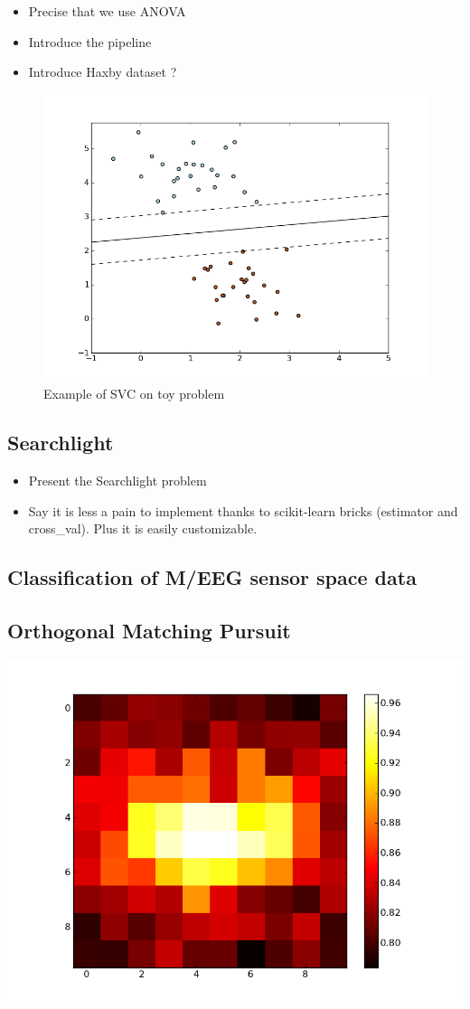 \documentclass{frontiersSCNS} %
\begin{document}
\begin{itemize}
    \item Precise that we use ANOVA
    \item Introduce the pipeline
    \item Introduce Haxby dataset ?
\end{itemize}




\begin{figure}
    \includegraphics[width=.5\linewidth]{img/plot_sgd_separating_hyperplane_1.png}
    \caption{Example of SVC on toy problem}
\end{figure}

\subsection{Searchlight}

\begin{itemize}
    \item Present the Searchlight problem
    \item Say it is less a pain to implement thanks to scikit-learn bricks
        (estimator and cross\_val). Plus it is easily customizable.
\end{itemize}

\subsection{Classification of M/EEG sensor space data}


\subsection{Orthogonal Matching Pursuit}




\includegraphics[width=.5\linewidth]{img/logistic_l1_scores.png}
\end{document}
